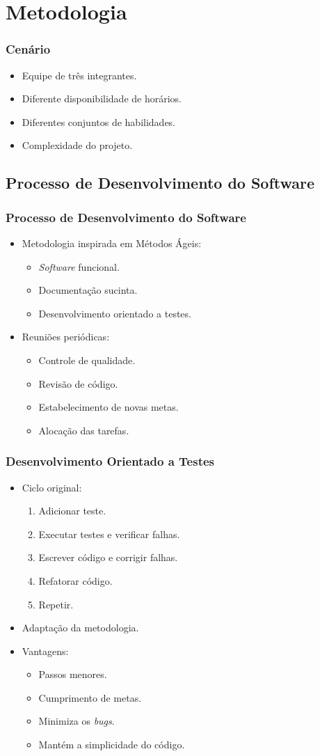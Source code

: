 \section{Metodologia}

\frame
{
\frametitle{Cenário}
\begin{itemize}
	\item Equipe de três integrantes.
	\item Diferente disponibilidade de horários.
	\item Diferentes conjuntos de habilidades.
	\item Complexidade do projeto.
\end{itemize}
}

\subsection{Processo de Desenvolvimento do Software}
\frame
{
\frametitle{Processo de Desenvolvimento do Software}
\begin{itemize}
	\item Metodologia inspirada em Métodos Ágeis:
	\begin{itemize}
		\item \emph{Software} funcional.
		\item Documentação sucinta.
		\item Desenvolvimento orientado a testes.
	\end{itemize}
	\item Reuniões periódicas:
	\begin{itemize}
		\item Controle de qualidade.
		\item Revisão de código.
		\item Estabelecimento de novas metas.
		\item Alocação das tarefas.
	\end{itemize}
\end{itemize}
}
\frame
{
\frametitle{Desenvolvimento Orientado a Testes}
\begin{itemize}
	\item Ciclo original:
	\begin{enumerate}
		\item Adicionar teste.
		\item Executar testes e verificar falhas.
		\item Escrever código e corrigir falhas.
		\item Refatorar código.
		\item Repetir.
	\end{enumerate}
	\item Adaptação da metodologia.
	\item Vantagens:
	\begin{itemize}
		\item Passos menores.
		\item Cumprimento de metas.
		\item Minimiza os \emph{bugs}.
		\item Mantém a simplicidade do código.
	\end{itemize}
\end{itemize}
}
